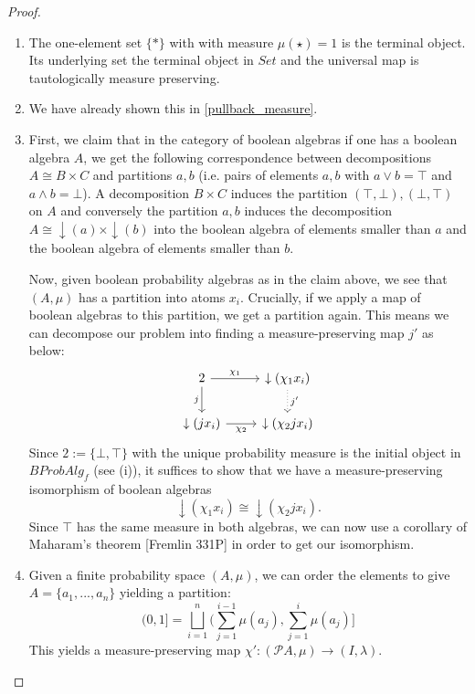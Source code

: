 \documentclass[a4paper,draft]{amsproc}
\theoremstyle{plain}
\theoremstyle{definition}
\theoremstyle{remark}
\numberwithin{equation}{section}
\begin{document}
\begin{proof} 
\begin{enumerate}
\item The one-element set $\{*\}$ with with measure $\mu(\star)=1$ is the terminal object. Its underlying set the terminal object in $Set$ and the universal map is tautologically measure preserving.
\item We have already shown this in \ref{pullback_measure}.
\item First, we claim that in the category of boolean algebras if one has a boolean algebra $A$, we get the following correspondence between decompositions $A \cong B \times C$ and partitions $a,b$ (i.e. pairs of elements $a,b$ with $a \vee b = \top$ and $a \wedge b = \bot$). A decomposition $B \times C$ induces the partition $(\top,\bot), (\bot,\top)$ on $A$ and conversely the partition $a,b$ induces the decomposition $A \cong \downarrow(a) \times \downarrow(b)$ into the boolean algebra of elements smaller than $a$ and the boolean algebra of elements smaller than $b$.

Now, given boolean probability algebras as in the claim above, we see that $(A, \mu)$ has a partition into atoms $x_i$. Crucially, if we apply a map of boolean algebras to this partition, we get a partition again. This means we can decompose our problem into finding a measure-preserving map $j'$ as below:
\[
\begin{tikzcd}
2 \arrow[d, "j"'] \arrow[r, "\chi_1"]  & \downarrow(\chi_1 x_i) \arrow[d, "j'", dotted] \\
\downarrow(j x_i) \arrow[r, "\chi_2"'] & \downarrow(\chi_2 j x_i)                      
\end{tikzcd}
\]
Since $2 := \{\bot, \top\}$ with the unique probability measure is the initial object in $BProbAlg_f$ (see (i)), it suffices to show that we have a measure-preserving isomorphism of boolean algebras
\[
\downarrow(\chi_1 x_i) \cong \downarrow(\chi_2 j x_i).
\]
Since $\top$ has the same measure in both algebras, we can now use a corollary of Maharam's theorem [Fremlin 331P] in order to get our isomorphism.

\item Given a finite probability space $(A,\mu)$, we can order the elements to give $A=\{a_1,...,a_n\}$ yielding a partition:
\[ (0,1]=\bigsqcup_{i=1}^n (\sum_{j=1}^{i-1} \mu(a_j), \sum_{j=1}^{i} \mu(a_j)]\]
This yields a measure-preserving map $\chi':(\mathcal{P} A,\mu)\rightarrow (I,\lambda)$.



\end{enumerate}
\end{proof}
\end{document}
